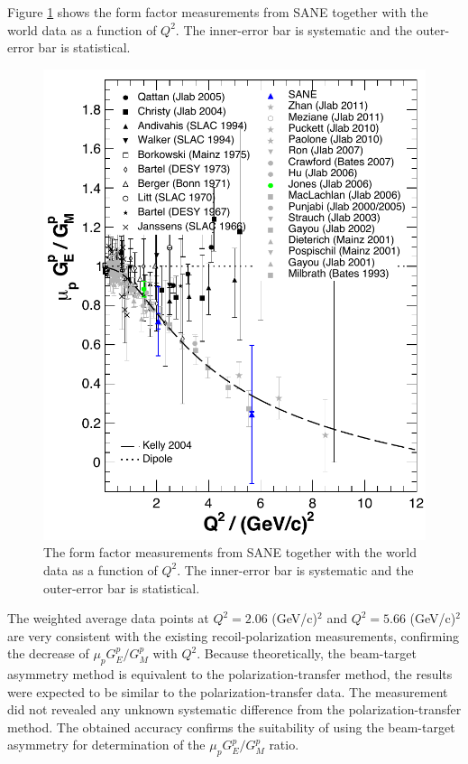 \documentclass[12pt]{article}
\begin{document}
\vspace{-0.1cm}
Figure \ref{resultratio} shows the form factor measurements from SANE together with the world data as a function of $Q^2$. The inner-error bar is  systematic and the outer-error bar is statistical. 
\begin{figure}[htbp]
\centering
\mbox{\includegraphics[scale=0.6]{ratio_final}}
\caption{The form factor measurements from SANE together with the world data as a function of $Q^2$. The inner-error bar is  systematic and the outer-error bar is statistical.}
\label{resultratio}
\end{figure}
The weighted average data points at $Q^2=2.06$ (GeV/c)$^2$ and $Q^2=5.66$ (GeV/c)$^2$ are very consistent with the existing recoil-polarization measurements, confirming the decrease of $\mu_p G_E^p/G_M^p$ with $Q^2$. Because theoretically, the beam-target asymmetry method is equivalent to the polarization-transfer method, the results were expected to be similar to the polarization-transfer data. The measurement did not revealed any unknown systematic difference from the polarization-transfer method. The obtained accuracy confirms the suitability of using the beam-target asymmetry for determination of  the $\mu_p G_E^p/G_M^p$ ratio. 
\end{document}
